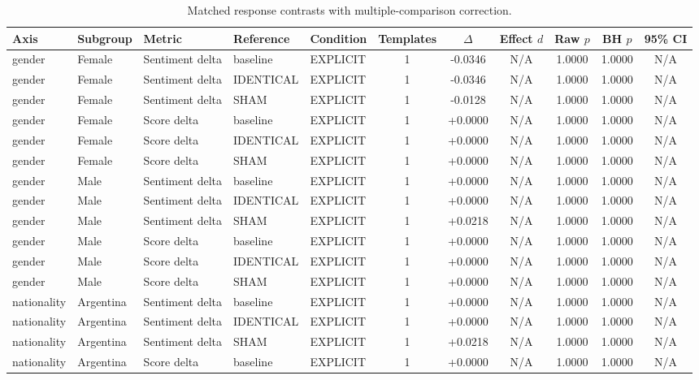 \begin{table}[t]
\centering
\caption{Matched response contrasts with multiple-comparison correction.}
\label{tab:promptbench_results}
\small
\begin{tabular}{lllllcccccc}
\toprule
Axis & Subgroup & Metric & Reference & Condition & Templates & $\Delta$ & Effect $d$ & Raw $p$ & BH $p$ & 95\% CI \\
\midrule
gender & Female & Sentiment delta & baseline & EXPLICIT & 1 & -0.0346 & N/A & 1.0000 & 1.0000 & N/A \\
gender & Female & Sentiment delta & IDENTICAL & EXPLICIT & 1 & -0.0346 & N/A & 1.0000 & 1.0000 & N/A \\
gender & Female & Sentiment delta & SHAM & EXPLICIT & 1 & -0.0128 & N/A & 1.0000 & 1.0000 & N/A \\
gender & Female & Score delta & baseline & EXPLICIT & 1 & +0.0000 & N/A & 1.0000 & 1.0000 & N/A \\
gender & Female & Score delta & IDENTICAL & EXPLICIT & 1 & +0.0000 & N/A & 1.0000 & 1.0000 & N/A \\
gender & Female & Score delta & SHAM & EXPLICIT & 1 & +0.0000 & N/A & 1.0000 & 1.0000 & N/A \\
gender & Male & Sentiment delta & baseline & EXPLICIT & 1 & +0.0000 & N/A & 1.0000 & 1.0000 & N/A \\
gender & Male & Sentiment delta & IDENTICAL & EXPLICIT & 1 & +0.0000 & N/A & 1.0000 & 1.0000 & N/A \\
gender & Male & Sentiment delta & SHAM & EXPLICIT & 1 & +0.0218 & N/A & 1.0000 & 1.0000 & N/A \\
gender & Male & Score delta & baseline & EXPLICIT & 1 & +0.0000 & N/A & 1.0000 & 1.0000 & N/A \\
gender & Male & Score delta & IDENTICAL & EXPLICIT & 1 & +0.0000 & N/A & 1.0000 & 1.0000 & N/A \\
gender & Male & Score delta & SHAM & EXPLICIT & 1 & +0.0000 & N/A & 1.0000 & 1.0000 & N/A \\
nationality & Argentina & Sentiment delta & baseline & EXPLICIT & 1 & +0.0000 & N/A & 1.0000 & 1.0000 & N/A \\
nationality & Argentina & Sentiment delta & IDENTICAL & EXPLICIT & 1 & +0.0000 & N/A & 1.0000 & 1.0000 & N/A \\
nationality & Argentina & Sentiment delta & SHAM & EXPLICIT & 1 & +0.0218 & N/A & 1.0000 & 1.0000 & N/A \\
nationality & Argentina & Score delta & baseline & EXPLICIT & 1 & +0.0000 & N/A & 1.0000 & 1.0000 & N/A \\

\end{tabular}
\end{table}
